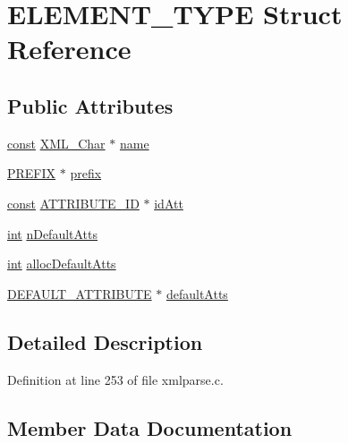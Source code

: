 \hypertarget{struct_e_l_e_m_e_n_t___t_y_p_e}{}\section{E\+L\+E\+M\+E\+N\+T\+\_\+\+T\+Y\+PE Struct Reference}
\label{struct_e_l_e_m_e_n_t___t_y_p_e}
\subsection*{Public Attributes}
\begin{DoxyCompactItemize}
\item 
\hyperlink{getopt1_8c_a2c212835823e3c54a8ab6d95c652660e}{const} \hyperlink{amiga_2include_2libraries_2expat_8h_a63da96463e775e1ec3a7d1f076208127}{X\+M\+L\+\_\+\+Char} $\ast$ \hyperlink{struct_e_l_e_m_e_n_t___t_y_p_e_a2deef90a38a75ca322e5838d92e446b2}{name}
\item 
\hyperlink{xmlparse_8c_aa3f98fd58683acd364daca2ddc737491}{P\+R\+E\+F\+IX} $\ast$ \hyperlink{struct_e_l_e_m_e_n_t___t_y_p_e_add87dda9402834586807f57625601afa}{prefix}
\item 
\hyperlink{getopt1_8c_a2c212835823e3c54a8ab6d95c652660e}{const} \hyperlink{xmlparse_8c_ab0dc92cf6eadf5e62d25ee83cf2605f4}{A\+T\+T\+R\+I\+B\+U\+T\+E\+\_\+\+ID} $\ast$ \hyperlink{struct_e_l_e_m_e_n_t___t_y_p_e_a96fd1087b59b14452b385134f5568bdd}{id\+Att}
\item 
\hyperlink{xmltok_8h_a5a0d4a5641ce434f1d23533f2b2e6653}{int} \hyperlink{struct_e_l_e_m_e_n_t___t_y_p_e_a258032c83d58695d5f8562a6f676cd71}{n\+Default\+Atts}
\item 
\hyperlink{xmltok_8h_a5a0d4a5641ce434f1d23533f2b2e6653}{int} \hyperlink{struct_e_l_e_m_e_n_t___t_y_p_e_a4c3a11c30ad031031f7fd3676e10f546}{alloc\+Default\+Atts}
\item 
\hyperlink{struct_d_e_f_a_u_l_t___a_t_t_r_i_b_u_t_e}{D\+E\+F\+A\+U\+L\+T\+\_\+\+A\+T\+T\+R\+I\+B\+U\+TE} $\ast$ \hyperlink{struct_e_l_e_m_e_n_t___t_y_p_e_a7f2631acfda68bac3cde4fe07ab4008e}{default\+Atts}
\end{DoxyCompactItemize}


\subsection{Detailed Description}


Definition at line 253 of file xmlparse.\+c.



\subsection{Member Data Documentation}
